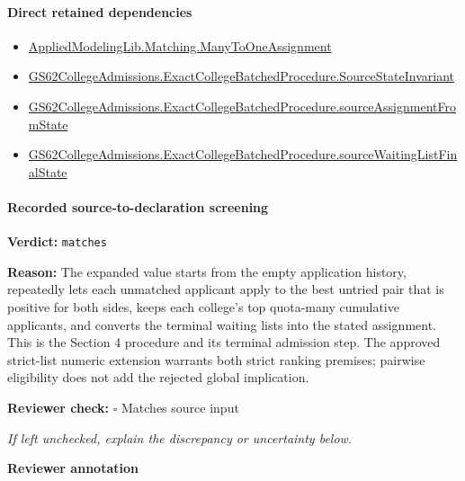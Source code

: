 \documentclass[10pt]{article}
\newcommand{\reviewerbox}{%
  \par\noindent\fbox{\parbox{0.96\linewidth}{\rule{0pt}{0.38in}}}\par
}
\newcommand{\reviewmatch}[1]{%
  \par\noindent\textbf{Reviewer check:} $\square$\; #1\par
  \noindent\emph{If left unchecked, explain the discrepancy or uncertainty below.}\par
}
\begin{document}
\paragraph{Direct retained dependencies}
\begin{itemize}\raggedright
\item \hyperlink{governing-declaration-5f205dc5e20311a8}{Applied\allowbreak{}Modeling\allowbreak{}Lib.\allowbreak{}Matching.\allowbreak{}Many\allowbreak{}To\allowbreak{}One\allowbreak{}Assignment}
\item \hyperlink{governing-declaration-2852be7ab15a9eaa}{GS62\allowbreak{}College\allowbreak{}Admissions.\allowbreak{}Exact\allowbreak{}College\allowbreak{}Batched\allowbreak{}Procedure.\allowbreak{}Source\allowbreak{}State\allowbreak{}Invariant}
\item \hyperlink{governing-declaration-afdcf9105d64d786}{GS62\allowbreak{}College\allowbreak{}Admissions.\allowbreak{}Exact\allowbreak{}College\allowbreak{}Batched\allowbreak{}Procedure.\allowbreak{}source\allowbreak{}Assignment\allowbreak{}From\allowbreak{}State}
\item \hyperlink{paper-prerequisite-6b7d3de7046692a6}{GS62\allowbreak{}College\allowbreak{}Admissions.\allowbreak{}Exact\allowbreak{}College\allowbreak{}Batched\allowbreak{}Procedure.\allowbreak{}source\allowbreak{}Waiting\allowbreak{}List\allowbreak{}Final\allowbreak{}State}
\end{itemize}
\paragraph{Recorded source-to-declaration screening}
\textbf{Verdict:} \texttt{matches}
\\
{\raggedright
\textbf{Reason:} The expanded value starts from the empty application history, repeatedly lets each unmatched applicant apply to the best untried pair that is positive for both sides, keeps each college's top quota-\allowbreak{}many cumulative applicants, and converts the terminal waiting lists into the stated assignment.\allowbreak{} This is the Section 4 procedure and its terminal admission step.\allowbreak{} The approved strict-\allowbreak{}list numeric extension warrants both strict ranking premises;\allowbreak{} pairwise eligibility does not add the rejected global implication.\allowbreak{}
\par}
\reviewmatch{Matches source input}
\noindent\textbf{Reviewer annotation}\par
\reviewerbox

\clearpage
\hypertarget{source-claim-4b269aa42b6f656d}{}
\hypertarget{source-section-0c7af8265958a9ea}{}
\end{document}
